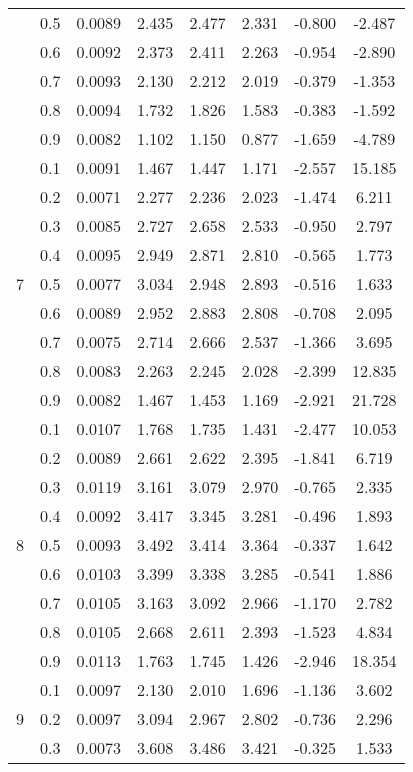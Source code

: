 \documentclass[11pt,a4paper]{report}
\begin{document}
\begin{longtable}{ | c | c || c | c | c | c | c | c | }
 & 0.5 & 0.0089 & 2.435 & 2.477 & 2.331 & -0.800 & -2.487 \\
 & 0.6 & 0.0092 & 2.373 & 2.411 & 2.263 & -0.954 & -2.890 \\
 & 0.7 & 0.0093 & 2.130 & 2.212 & 2.019 & -0.379 & -1.353 \\
 & 0.8 & 0.0094 & 1.732 & 1.826 & 1.583 & -0.383 & -1.592 \\
 & 0.9 & 0.0082 & 1.102 & 1.150 & 0.877 & -1.659 & -4.789 \\
 \hline
\multirow{9}{*}{7} & 0.1 & 0.0091 & 1.467 & 1.447 & 1.171 & -2.557 & 15.185 \\
 & 0.2 & 0.0071 & 2.277 & 2.236 & 2.023 & -1.474 & 6.211 \\
 & 0.3 & 0.0085 & 2.727 & 2.658 & 2.533 & -0.950 & 2.797 \\
 & 0.4 & 0.0095 & 2.949 & 2.871 & 2.810 & -0.565 & 1.773 \\
 & 0.5 & 0.0077 & 3.034 & 2.948 & 2.893 & -0.516 & 1.633 \\
 & 0.6 & 0.0089 & 2.952 & 2.883 & 2.808 & -0.708 & 2.095 \\
 & 0.7 & 0.0075 & 2.714 & 2.666 & 2.537 & -1.366 & 3.695 \\
 & 0.8 & 0.0083 & 2.263 & 2.245 & 2.028 & -2.399 & 12.835 \\
 & 0.9 & 0.0082 & 1.467 & 1.453 & 1.169 & -2.921 & 21.728 \\
 \hline
\multirow{9}{*}{8} & 0.1 & 0.0107 & 1.768 & 1.735 & 1.431 & -2.477 & 10.053 \\
 & 0.2 & 0.0089 & 2.661 & 2.622 & 2.395 & -1.841 & 6.719 \\
 & 0.3 & 0.0119 & 3.161 & 3.079 & 2.970 & -0.765 & 2.335 \\
 & 0.4 & 0.0092 & 3.417 & 3.345 & 3.281 & -0.496 & 1.893 \\
 & 0.5 & 0.0093 & 3.492 & 3.414 & 3.364 & -0.337 & 1.642 \\
 & 0.6 & 0.0103 & 3.399 & 3.338 & 3.285 & -0.541 & 1.886 \\
 & 0.7 & 0.0105 & 3.163 & 3.092 & 2.966 & -1.170 & 2.782 \\
 & 0.8 & 0.0105 & 2.668 & 2.611 & 2.393 & -1.523 & 4.834 \\
 & 0.9 & 0.0113 & 1.763 & 1.745 & 1.426 & -2.946 & 18.354 \\
 \hline
\multirow{9}{*}{9} & 0.1 & 0.0097 & 2.130 & 2.010 & 1.696 & -1.136 & 3.602 \\
 & 0.2 & 0.0097 & 3.094 & 2.967 & 2.802 & -0.736 & 2.296 \\
 & 0.3 & 0.0073 & 3.608 & 3.486 & 3.421 & -0.325 & 1.533 \\

\end{longtable}
\end{document}
